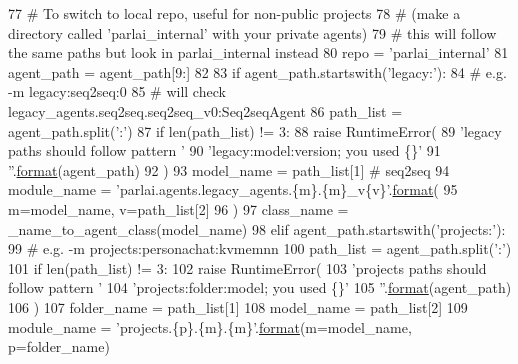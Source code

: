\begin{DoxyCode}
77         \textcolor{comment}{# To switch to local repo, useful for non-public projects}
78         \textcolor{comment}{# (make a directory called 'parlai\_internal' with your private agents)}
79         \textcolor{comment}{# this will follow the same paths but look in parlai\_internal instead}
80         repo = \textcolor{stringliteral}{'parlai\_internal'}
81         agent\_path = agent\_path[9:]
82 
83     \textcolor{keywordflow}{if} agent\_path.startswith(\textcolor{stringliteral}{'legacy:'}):
84         \textcolor{comment}{# e.g. -m legacy:seq2seq:0}
85         \textcolor{comment}{# will check legacy\_agents.seq2seq.seq2seq\_v0:Seq2seqAgent}
86         path\_list = agent\_path.split(\textcolor{stringliteral}{':'})
87         \textcolor{keywordflow}{if} len(path\_list) != 3:
88             \textcolor{keywordflow}{raise} RuntimeError(
89                 \textcolor{stringliteral}{'legacy paths should follow pattern '}
90                 \textcolor{stringliteral}{'legacy:model:version; you used \{\}'}
91                 \textcolor{stringliteral}{''}.\hyperlink{namespaceparlai_1_1chat__service_1_1services_1_1messenger_1_1shared__utils_a32e2e2022b824fbaf80c747160b52a76}{format}(agent\_path)
92             )
93         model\_name = path\_list[1]  \textcolor{comment}{# seq2seq}
94         module\_name = \textcolor{stringliteral}{'parlai.agents.legacy\_agents.\{m\}.\{m\}\_v\{v\}'}.\hyperlink{namespaceparlai_1_1chat__service_1_1services_1_1messenger_1_1shared__utils_a32e2e2022b824fbaf80c747160b52a76}{format}(
95             m=model\_name, v=path\_list[2]
96         )
97         class\_name = \_name\_to\_agent\_class(model\_name)
98     \textcolor{keywordflow}{elif} agent\_path.startswith(\textcolor{stringliteral}{'projects:'}):
99         \textcolor{comment}{# e.g. -m projects:personachat:kvmemnn}
100         path\_list = agent\_path.split(\textcolor{stringliteral}{':'})
101         \textcolor{keywordflow}{if} len(path\_list) != 3:
102             \textcolor{keywordflow}{raise} RuntimeError(
103                 \textcolor{stringliteral}{'projects paths should follow pattern '}
104                 \textcolor{stringliteral}{'projects:folder:model; you used \{\}'}
105                 \textcolor{stringliteral}{''}.\hyperlink{namespaceparlai_1_1chat__service_1_1services_1_1messenger_1_1shared__utils_a32e2e2022b824fbaf80c747160b52a76}{format}(agent\_path)
106             )
107         folder\_name = path\_list[1]
108         model\_name = path\_list[2]
109         module\_name = \textcolor{stringliteral}{'projects.\{p\}.\{m\}.\{m\}'}.\hyperlink{namespaceparlai_1_1chat__service_1_1services_1_1messenger_1_1shared__utils_a32e2e2022b824fbaf80c747160b52a76}{format}(m=model\_name, p=folder\_name)

\end{DoxyCode}
